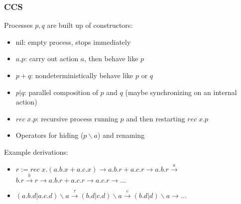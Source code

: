 \documentclass{beamer}
\begin{document}
\begin{frame}[fragile]\frametitle{CCS}

  Processes $p,q$ are built up of constructors:

  \begin{itemize}
  \item nil: empty process, stops immediately
  \item $a.p$: carry out action $a$, then behave like $p$
  \item $p + q$: nondeterministically behave like $p$ or $q$
  \item $p | q$: parallel composition of $p$ and $q$ (maybe synchronizing on
    an internal action)
  \item $rec\; x. p$: recursive process running $p$ and then restarting $rec\;
    x. p$
    
  \item Operators for hiding ($p \backslash a$) and renaming
  \end{itemize}

  Example derivations:
  \begin{itemize}
  \item $r := rec\; x. (a.b.x + a.c.x) \longrightarrow a.b.r + a.c.r
    \longrightarrow a.b.r \stackrel{a}{\longrightarrow}$\\
    $b.r \stackrel{b}{\longrightarrow} r \longrightarrow a.b.r + a.c.r
    \longrightarrow a.c.r \longrightarrow \dots$ 
  \item $(a.b.d | a.c.d)\backslash a \stackrel{\tau}{\longrightarrow} (b.d | c.d)\backslash a \stackrel{c}{\longrightarrow} 
    (b.d | d)\backslash a \longrightarrow \dots$ 
  \end{itemize}

\end{frame}
\end{document}
